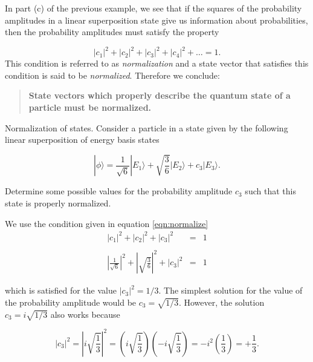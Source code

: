 In part (c) of the previous example, we see that if the squares of
the probability amplitudes in a linear superposition state give us
information about probabilities, then the probability amplitudes must
satisfy the property

\begin{equation}
|c_1|^2 + |c_2|^2 + |c_3|^2 + |c_4|^2 + \ldots = 1 .
\label{eqn:normalize}
\end{equation}
This condition is referred to as {\em normalization} and a state vector that satisfies this condition is said to be {\em normalized}.  Therefore we conclude:
\\
\begin{quote}
{\bf State vectors which properly describe the quantum state of a particle must be normalized.}
\end{quote}

\begin{example}{Normalization of states.}
\label{exam:Normalized}
Consider a particle in a state given by the following linear superposition of energy basis states

\begin{equation}
|\mbox{$\phi$}\rangle = \frac{1}{\sqrt{6}} |\mbox{$E_1$}\rangle + \sqrt{\frac{3}{6}} |\mbox{$E_2$}\rangle + c_3 |\mbox{$E_3$}\rangle  .
\end{equation}

Determine some possible values for the probability amplitude $c_3$
such that this state is properly normalized.

\begin{solution}
We use the condition given in equation \ref{eqn:normalize}
\begin{eqnarray}
|c_1|^2 + |c_2|^2 + |c_3|^2 & = & 1 \nonumber\\
\nonumber \\
\left|\frac{1}{\sqrt{6}}\right|^2 + \left|\sqrt{\frac{3}{6}}\right|^2 + |c_3|^2 & = & 1 \nonumber 
\end{eqnarray}

\noindent which is satisfied for the value $|c_3|^2 = 1/3$.  The simplest
solution for the value of the probability amplitude would be $c_3 =
\sqrt{1/3}$.  However, the solution $c_3 = i \sqrt{1/3}$ also works
because

\begin{equation}
|c_3|^2 = \left| i \sqrt{\frac{1}{3}}\right|^2 = \left( i \sqrt{\frac{1}{3}} \right) \left( -i \sqrt{\frac{1}{3}} \right) = - i^2 \left(\frac{1}{3} \right) = + \frac{1}{3}  .\nonumber
\end{equation}

\end{solution}
\end{example}

